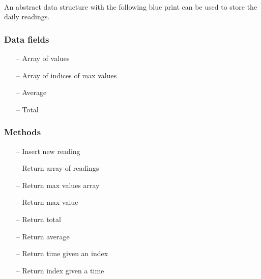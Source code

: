 \documentclass[12pt]{article}
\begin{document}
\paragraph{}An abstract data structure with the following blue print can be used to store the daily readings.
\subsubsection{Data fields}
\begin{enumerate}
	\item[--] Array of values
	\item[--] Array of indices of max values
	\item[--] Average
	\item[--] Total
\end{enumerate}
\subsubsection{Methods}
\begin{enumerate}
	\item[--] Insert new reading
	\item[--] Return array of readings
	\item[--] Return max values array
	\item[--] Return max value
	\item[--] Return total
	\item[--] Return average
	\item[--] Return time given an index
	\item[--] Return index given a time
\end{enumerate}
\end{document}
